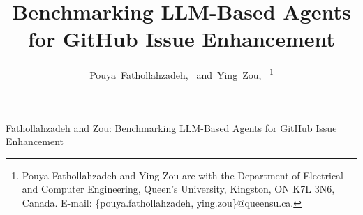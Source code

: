 \documentclass[journal]{IEEEtran}
\begin{document}
\title{Benchmarking LLM-Based Agents for GitHub Issue Enhancement}

\author{Pouya~Fathollahzadeh,~
        and~Ying~Zou,~
\thanks{Pouya Fathollahzadeh and Ying Zou are with the Department of Electrical and Computer Engineering, Queen's University, Kingston, ON K7L 3N6, Canada. E-mail: \{pouya.fathollahzadeh, ying.zou\}@queensu.ca.}}

{Fathollahzadeh and Zou: Benchmarking LLM-Based Agents for GitHub Issue Enhancement}

\maketitle
\end{document}
